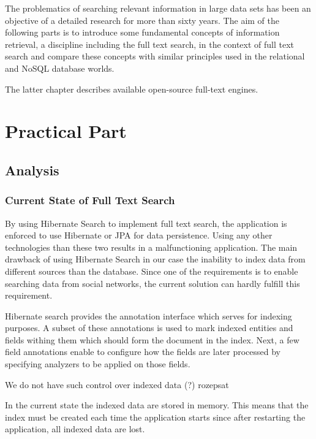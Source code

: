 \documentclass[12pt, oneside, a4paper]{book}
\begin{document}
The problematics of searching relevant information in large data sets has been an objective of a detailed research for more than sixty years. 
The aim of the following parts is to introduce some fundamental concepts of information retrieval, a discipline including the full text search, in the context of full text search and compare these concepts with similar principles used in the relational and
NoSQL database worlds.

The latter chapter describes available open-source full-text engines.












\part{Practical Part}


\chapter{Analysis}

\section{Current State of Full Text Search}

By using Hibernate Search to implement full text search, the application
is enforced to use Hibernate or JPA for data persistence. Using any other
technologies than these two results in a malfunctioning application.
The main drawback of using Hibernate Search in our case the inability to index
data from different sources than the database. Since one of the requirements
is to enable searching data from social networks, the current solution
can hardly fulfill this requirement. 

Hibernate search provides the annotation interface which serves for
indexing purposes. A subset of these annotations is used to mark indexed
entities and fields withing them which should form the document in
the index. Next, a few field annotations enable to configure how the
fields are later processed by specifying analyzers to be applied on
those fields.

We do not have such control over indexed data (?) rozepsat

In the current state the indexed data are stored in memory. This means
that the index must be created each time the application starts since
after restarting the application, all indexed data are lost.
\end{document}
